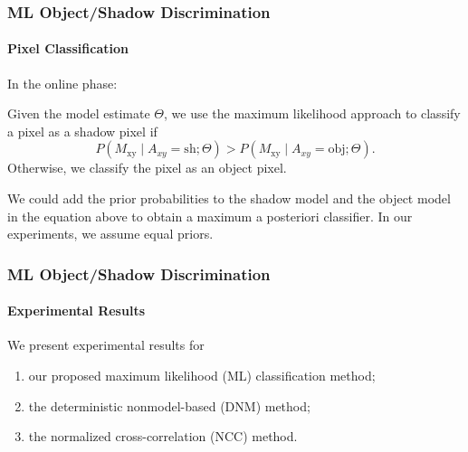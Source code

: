 
\begin{frame}
    \frametitle{ML Object/Shadow Discrimination}
    \framesubtitle{Pixel Classification}
  
    In the \alert{online} phase:

    \medskip

    Given the model estimate $\Theta$, we use the
    maximum likelihood approach to classify a pixel as a shadow pixel if
    \begin{equation*}
        \label{eq:ml}
        P(M_{\text{xy}} \mid A_{xy}=\text{sh} ; \Theta ) >
        P(M_{\text{xy}} \mid A_{xy}=\text{obj} ; \Theta ).
    \end{equation*}
    Otherwise, we classify the pixel as an object pixel.
  
    \bigskip
  
    We could add the prior probabilities to the shadow model
    and the object model in the equation above to obtain a maximum a 
    posteriori classifier. In our experiments, we assume equal priors.

\end{frame}


\begin{frame}
    \frametitle{ML Object/Shadow Discrimination}
    \framesubtitle{Experimental Results}

    We present experimental results for
    \begin{enumerate}
        \item our proposed maximum likelihood (ML) classification method; 
        \item the deterministic nonmodel-based (DNM) method;
        \item the normalized cross-correlation (NCC) method.
    \end{enumerate}

\end{frame}


